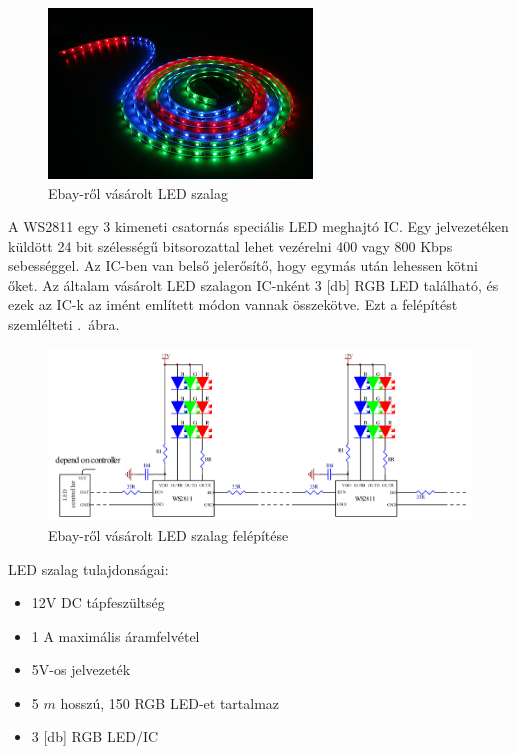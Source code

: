 \documentclass[../main.tex]{subfiles}
\begin{document}
            \begin{figure}[h!]
                \centering
                    \includegraphics[width=7cm]{resources/pcb_res/ledstrip}
                \caption{Ebay-ről vásárolt LED szalag}
                \label{fig:ledstrip}
            \end{figure}
        
            A WS2811 egy 3 kimeneti csatornás speciális LED meghajtó IC. Egy jelvezetéken küldött 24 bit szélességű bitsorozattal lehet vezérelni 400 vagy 800 Kbps sebességgel. Az IC-ben van belső jelerősítő, hogy egymás után lehessen kötni őket. Az általam vásárolt LED szalagon IC-nként 3 [db] RGB LED található, és ezek az IC-k az imént említett módon vannak összekötve. Ezt a felépítést szemlélteti .~ábra.\\[12px]
            
            \begin{figure}[h!]
                \centering
                \includegraphics[width=14cm]{resources/pcb_res/ledstrip_schematic.png}
                \caption{Ebay-ről vásárolt LED szalag felépítése\cite{ds_ws2811}}
                \label{fig:ledstrip_schematic}
            \end{figure}
            
            LED szalag tulajdonságai:
            \begin{itemize}
                \item 12V DC tápfeszültség
                \item 1 A maximális áramfelvétel
                \item 5V-os jelvezeték
                \item 5 $m$ hosszú, 150 RGB LED-et tartalmaz
                \item 3 [db] RGB LED/IC
            \end{itemize}
            
\end{document}
